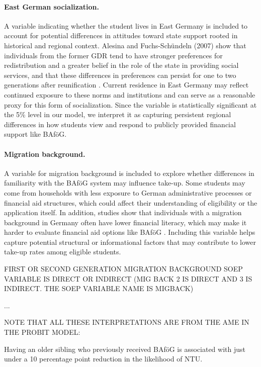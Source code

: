\paragraph{East German socialization.}  A variable indicating whether the student lives in East Germany is included to account for potential differences in attitudes toward state support rooted in historical and regional context. Alesina and Fuchs-Schündeln (2007) show that individuals from the former GDR tend to have stronger preferences for redistribution and a greater belief in the role of the state in providing social services, and that these differences in preferences can persist for one to two generations after reunification \citep{alesina_good-bye_2007}. Current residence in East Germany may reflect continued exposure to these norms and institutions and can serve as a reasonable proxy for this form of socialization. Since the variable is statistically significant at the 5\% level in our model, we interpret it as capturing persistent regional differences in how students view and respond to publicly provided financial support like BAföG.

\paragraph{Migration background.} A variable for migration background is included to explore whether differences in familiarity with the BAföG system may influence take-up. Some students may come from households with less exposure to German administrative processes or financial aid structures, which could affect their understanding of eligibility or the application itself. In addition, studies show that individuals with a migration background in Germany often have lower financial literacy, which may make it harder to evaluate financial aid options like BAföG \citep{Tsegay_2024}. Including this variable helps capture potential structural or informational factors that may contribute to lower take-up rates among eligible students. 

FIRST OR SECOND GENERATION MIGRATION BACKGROUND SOEP VARIABLE IS DIRECT OR INDIRECT (MIG BACK 2 IS DIRECT AND 3 IS INDIRECT. THE SOEP VARIABLE NAME IS MIGBACK)

...

NOTE THAT ALL THESE INTERPRETATIONS ARE FROM THE AME IN THE PROBIT MODEL:

Having an older sibling who previously received BAföG is associated with just under a 10 percentage point reduction in the likelihood of NTU.


